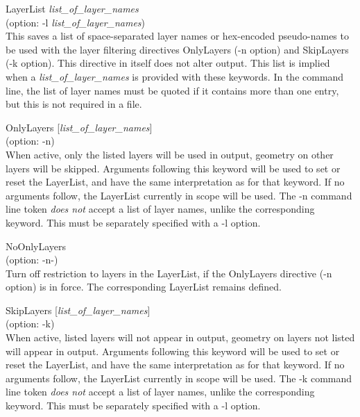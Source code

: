 \begin{description}
\item{\vt LayerList} {\it list\_of\_layer\_names}\\
(option: {\vt -l} {\it list\_of\_layer\_names})\\
This saves a list of space-separated layer names or hex-encoded
pseudo-names to be used with the layer filtering directives {\vt
OnlyLayers} ({\vt -n} option) and {\vt SkipLayers} ({\vt -k} option). 
This directive in itself does not alter output.  This list is implied
when a {\it list\_of\_layer\_names} is provided with these keywords. 
In the command line, the list of layer names must be quoted if it
contains more than one entry, but this is not required in a file.

\item{\vt OnlyLayers} [{\it list\_of\_layer\_names\/}]\\
(option: {\vt -n})\\
When active, only the listed layers will be used in output, geometry
on other layers will be skipped.  Arguments following this keyword
will be used to set or reset the {\vt LayerList}, and have the same
interpretation as for that keyword.  If no arguments follow, the {\vt
LayerList} currently in scope will be used.  The {\vt -n} command line
token {\it does not} accept a list of layer names, unlike the
corresponding keyword.  This must be separately specified with a {\vt
-l} option.

\item{\vt NoOnlyLayers}\\
(option: {\vt -n-})\\
Turn off restriction to layers in the {\vt LayerList}, if the {\vt
OnlyLayers} directive ({\vt -n} option) is in force.  The
corresponding {\vt LayerList} remains defined.

\item{\vt SkipLayers} [{\it list\_of\_layer\_names\/}]\\
(option: {\vt -k})\\
When active, listed layers will not appear in output, geometry on
layers not listed will appear in output.  Arguments following this
keyword will be used to set or reset the {\vt LayerList}, and have the
same interpretation as for that keyword.  If no arguments follow, the
{\vt LayerList} currently in scope will be used.  The {\vt -k} command
line token {\it does not} accept a list of layer names, unlike the
corresponding keyword.  This must be separately specified with a {\vt
-l} option.


\end{description}
